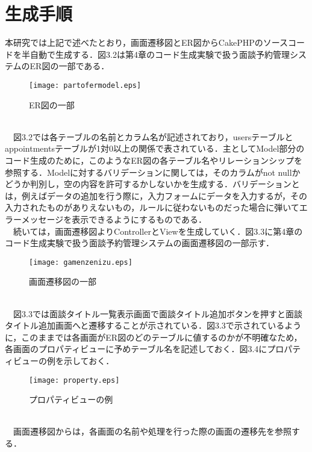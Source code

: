 \documentclass{funthesis}
\begin{document}
\section{生成手順}
本研究では上記で述べたとおり，画面遷移図とER図からCakePHPのソースコードを半自動で生成する．図3.2は第4章のコード生成実験で扱う面談予約管理システムのER図の一部である．
\begin{figure}[h]
\begin{center}
\texttt{[image: partofermodel.eps]}
\caption{ER図の一部}
\end{center}
\end{figure}
\\
　図3.2では各テーブルの名前とカラム名が記述されており，usersテーブルとappointmentsテーブルが1対0以上の関係で表されている．主としてModel部分のコード生成のために，このようなER図の各テーブル名やリレーションシップを参照する．Modelに対するバリデーションに関しては，そのカラムがnot nullかどうか判別し，空の内容を許可するかしないかを生成する．バリデーションとは，例えばデータの追加を行う際に，入力フォームにデータを入力するが，その入力されたものがありえないもの，ルールに従わないものだった場合に弾いてエラーメッセージを表示できるようにするものである．\\
　続いては，画面遷移図よりControllerとViewを生成していく．図3.3に第4章のコード生成実験で扱う面談予約管理システムの画面遷移図の一部示す．
\begin{figure}[h]
\begin{center}
\texttt{[image: gamenzenizu.eps]}
\caption{画面遷移図の一部}
\end{center}
\end{figure}
\\
　図3.3では面談タイトル一覧表示画面で面談タイトル追加ボタンを押すと面談タイトル追加画面へと遷移することが示されている．図3.3で示されているように，このままでは各画面がER図のどのテーブルに値するのかが不明確なため，各画面のプロパティビューに予めテーブル名を記述しておく．図3.4にプロパティビューの例を示しておく．
\begin{figure}[h]
\begin{center}
\texttt{[image: property.eps]}
\caption{プロパティビューの例}
\end{center}
\end{figure}
\\
　画面遷移図からは，各画面の名前や処理を行った際の画面の遷移先を参照する．
\end{document}
